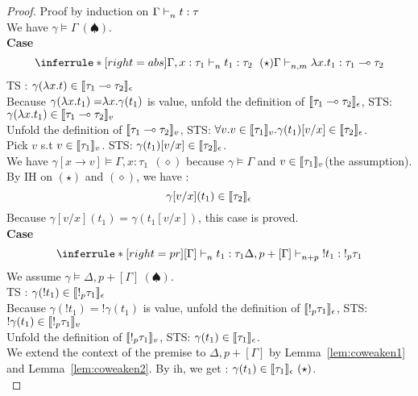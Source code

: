 \documentclass{article}
\begin{document}
 \begin{proof}  Proof by induction on  $\Gamma \mathrel{\vdash_{n}^{} {t} : {\tau}} $\\
 We have $ \gamma \vDash \Gamma ~(\spadesuit) $. \\
   \noindent \textbf{Case} 
 \[
 \inferrule*[right = abs]
   {\Gamma, x: \tau_1 \jtype{n}{}{t_1}{\tau_2}~(\star)}
   { \Gamma \jtype{n,m}{}{\abs{x}{t_1}}{\tau_1 \multimap \tau_2}  }
 \]
 TS : $ \gamma(\mathrel { \lambda {x} . {t} }) \in \llbracket {\tau_1 \multimap \tau_2} \rrbracket_{\epsilon} $ \\
 Because $\gamma(\mathrel { \lambda {x} . {t_1} }) =\mathrel { \lambda {x} . {\gamma(t_1)} } $ is value, unfold the definition of $\llbracket {\tau_1 \multimap \tau_2} \rrbracket_{\epsilon}$, STS: $ \gamma(\mathrel { \lambda {x} . {t_1} }) \in \llbracket {\tau_1 \multimap \tau_2} \rrbracket_{v} $\\
 Unfold the definition of $\llbracket {\tau_1 \multimap \tau_2} \rrbracket_{v}$, STS: $\forall v. v \in \llbracket {\tau_1} \rrbracket_{v}. \gamma(t_1)[v/x] \in \llbracket {\tau_2} \rrbracket_{\epsilon}  $.\\
 Pick $v$ s.t $ v \in \llbracket {\tau_1} \rrbracket_{v}$. STS: $\gamma(t_1)[v/x] \in \llbracket {\tau_2} \rrbracket_{\epsilon} $.\\
 We have $\gamma[x \rightarrow v] \vDash \Gamma, x: \tau_1 \ \ (\diamond) $ because $\gamma \vDash \Gamma$ and $ v \in \llbracket {\tau_1} \rrbracket_{v} $(the assumption). \\
 By IH on $(\star)$ and $(\diamond)$, we have : \\
   $$ \gamma[v/x](t_1) \in \llbracket {\tau_2} \rrbracket_{\epsilon}  $$
 Because $\gamma[v/x] (t_1) =  \gamma(t_1[v/x])$, this case is proved.\\
 
 \noindent \textbf{Case} 
 \[
 \inferrule*[right = pr]
   {[\Gamma] \jtype{n}{}{t_1}{\tau_1}}
   {\Delta, p + [\Gamma] \jtype{n+p}{}{!t_1}{!_p \tau_1}  }
 \]
 We assume $ \gamma \vDash \Delta, p+[\Gamma] ~(\spadesuit) $. \\
 TS : $ \gamma(!t_1) \in \llbracket {!_p \tau_1} \rrbracket_{\epsilon} $ \\
 Because $\gamma ( !t_1)= ! \gamma(t_1) $ is value, unfold the definition of $\llbracket {!_p \tau_1} \rrbracket_{\epsilon}$, STS: $ ! \gamma(t_1) \in \llbracket {!_p \tau_1} \rrbracket_{v} $\\
 Unfold the definition of $\llbracket {!_p \tau_1} \rrbracket_{v} $, STS: $\gamma (t_1) \in \llbracket {\tau_1} \rrbracket_{\epsilon}$. \\
 We extend the context of the premise to $\Delta, p+[\Gamma] $ by Lemma~\ref{lem:coweaken1} and Lemma~\ref{lem:coweaken2}. By ih, we get  : $\gamma (t_1) \in \llu{\tau_1}{\epsilon} ~(\star) $.\\
 

\end{proof}
\end{document}
